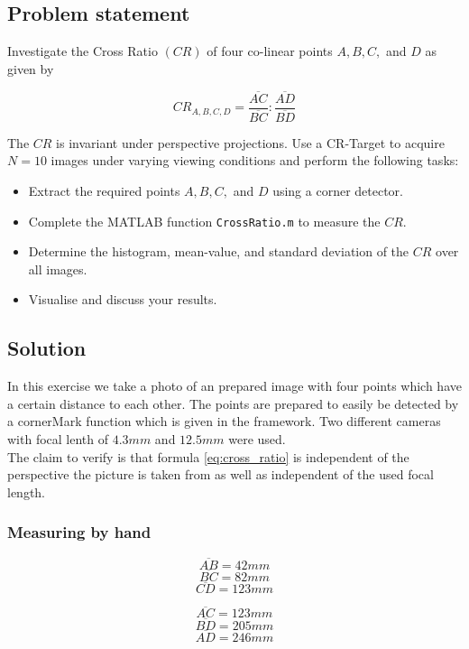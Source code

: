 \documentclass[
a4paper,     %
12pt         %
]{scrartcl}  %
\begin{document}
\subsection{Problem statement}

Investigate the Cross Ratio $(CR)$ of four co-linear points $A, B, C,$ and $D$ as given by

\begin{equation}
 CR_{A,B,C,D} = \frac{\overline{AC}}{\overline{BC}} : \frac{\overline{AD}}{\overline{BD}}
 \label{eq:cross_ratio}
\end{equation}

The $CR$ is invariant under perspective projections. Use a CR-Target to acquire $N = 10$ images under varying
viewing conditions and perform the following tasks:

\begin{itemize}
 \item Extract the required points $A, B, C,$ and $D$ using a corner detector.
 \item Complete the MATLAB function \texttt{CrossRatio.m} to measure the $CR$.
 \item Determine the histogram, mean-value, and standard deviation of the $CR$ over all images.
 \item Visualise and discuss your results.
\end{itemize}


\subsection{Solution}

In this exercise we take a photo of an prepared image with four points which have a certain distance to each other.
The points are prepared to easily be detected by a cornerMark function which is given in the framework.
Two different cameras with focal lenth of $4.3mm$ and $12.5mm$ were used.\\

The claim to verify is that formula \ref{eq:cross_ratio} is independent of the perspective the picture is taken from as well as independent of the used focal length.

\subsubsection{Measuring by hand}

\begin{minipage}{0.48\textwidth}
  $$\overline{AB} = 42mm$$
  $$\overline{BC} = 82mm$$
  $$\overline{CD} = 123mm$$
\end{minipage}
\begin{minipage}{0.48\textwidth}
  $$\overline{AC} = 123mm$$
  $$\overline{BD} = 205mm$$
  $$\overline{AD} = 246mm$$
\end{minipage}
\end{document}
